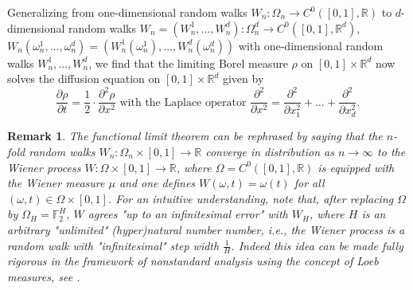 \documentclass[a4paper,11pt]{amsart}
\newcommand{\RR}{\mathbb{R}}
\newcommand{\FF}{\mathbb{F}}
\newtheorem{remark}[theorem]{Remark}
\begin{document}
Generalizing from one-dimensional random walks $W_n:\Omega_n\to C^0([0,1],\RR)$ to $d$-dimensional random walks $W_n=(W_n^1,\ldots,W_n^d):\Omega_n^d\to C^0([0,1],\RR^d)$, $W_n(\omega_n^1,\ldots,\omega_n^d)=(W_n^1(\omega_n^1),\ldots,W_n^d(\omega_n^d))$ with one-dimensional random walks $W^1_n,\ldots,W^d_n$, we find that the limiting Borel measure $\rho$ on $[0,1]\times\RR^d$ now solves the diffusion equation on $[0,1]\times\RR^d$ given by  \[\frac{\partial\rho}{\partial t} = \frac{1}{2}\cdot\frac{\partial^2\rho}{\partial x^2}\,\,\textrm{with the Laplace operator}\,\,\frac{\partial^2}{\partial x^2}=\frac{\partial^2}{\partial x_1^2}+\ldots+\frac{\partial^2}{\partial x_d^2}.\]
\begin{remark}\label{Wiener_process}
The functional limit theorem can be rephrased by saying that the $n$-fold random walks $W_n:\Omega_n\times [0,1]\to\RR$ converge \emph{in distribution} as $n\to\infty$ to the \emph{Wiener process} $W:\Omega\times [0,1]\to\RR$, where  $\Omega=C^0([0,1],\RR)$ is equipped with the Wiener measure $\mu$ and one defines $W(\omega,t)=\omega(t)$ for all $(\omega,t)\in\Omega\times [0,1]$. For an intuitive understanding, note that, after replacing $\Omega$ by $\Omega_H=\FF_2^H$, $W$ agrees "up to an infinitesimal error" with $W_H$, where $H$ is an arbitrary "unlimited" (hyper)natural number number, i.e., the Wiener process is a random walk with "infinitesimal" step width $\frac{1}{H}$. Indeed this idea can be made fully rigorous in the framework of nonstandard analysis using the concept of Loeb measures, see \cite{An}.
\end{remark}
\end{document}
